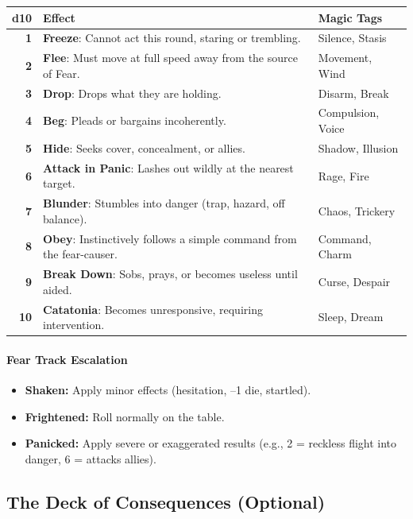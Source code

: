 \begin{center}
\begin{longtable}{>{\bfseries}r l l}
\toprule
d10 & Effect & Magic Tags \\
\midrule
1 & \textbf{Freeze}: Cannot act this round, staring or trembling. & Silence, Stasis \\
2 & \textbf{Flee}: Must move at full speed away from the source of Fear. & Movement, Wind \\
3 & \textbf{Drop}: Drops what they are holding. & Disarm, Break \\
4 & \textbf{Beg}: Pleads or bargains incoherently. & Compulsion, Voice \\
5 & \textbf{Hide}: Seeks cover, concealment, or allies. & Shadow, Illusion \\
6 & \textbf{Attack in Panic}: Lashes out wildly at the nearest target. & Rage, Fire \\
7 & \textbf{Blunder}: Stumbles into danger (trap, hazard, off balance). & Chaos, Trickery \\
8 & \textbf{Obey}: Instinctively follows a simple command from the fear-causer. & Command, Charm \\
9 & \textbf{Break Down}: Sobs, prays, or becomes useless until aided. & Curse, Despair \\
10 & \textbf{Catatonia}: Becomes unresponsive, requiring intervention. & Sleep, Dream \\
\bottomrule
\end{longtable}
\end{center}

\paragraph{Fear Track Escalation}
\begin{itemize}
  \item \textbf{Shaken:} Apply minor effects (hesitation, --1 die, startled).
  \item \textbf{Frightened:} Roll normally on the table.
  \item \textbf{Panicked:} Apply severe or exaggerated results (e.g., 2 = reckless flight into danger, 6 = attacks allies).
\end{itemize}

\subsection{The Deck of Consequences (Optional)}
\label{sec:deck-consequences}

